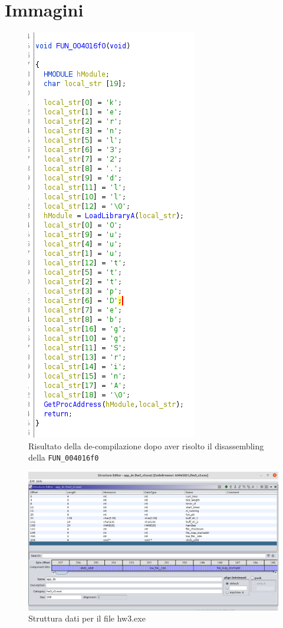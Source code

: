 \documentclass{article}
\begin{document}
\section*{Immagini}
\begin{figure}[!h]
\includegraphics[scale=0.5]{immagini/load_library}
\caption{Risultato della de-compilazione dopo aver risolto il disassembling della \texttt{FUN\_004016f0}}
\label{Fig1}
\end{figure}

\begin{figure}
	\includegraphics[scale=0.3]{immagini/hw3_struct.png}
	\caption{Struttura dati per il file hw3.exe}
	\label{Fig2}
\end{figure}
\end{document}
